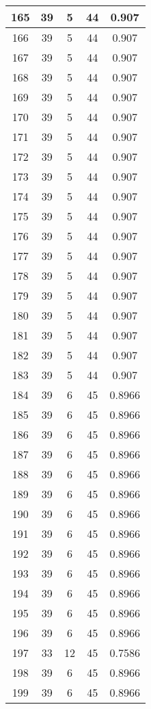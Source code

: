 \documentclass[letterpaper, 12pt]{article}
\begin{document}
\begin{longtable}{|c|c|c|c|c|}
\hline
165 & 39 & 5 & 44 & 0.907 \\
\hline
166 & 39 & 5 & 44 & 0.907 \\
\hline
167 & 39 & 5 & 44 & 0.907 \\
\hline
168 & 39 & 5 & 44 & 0.907 \\
\hline
169 & 39 & 5 & 44 & 0.907 \\
\hline
170 & 39 & 5 & 44 & 0.907 \\
\hline
171 & 39 & 5 & 44 & 0.907 \\
\hline
172 & 39 & 5 & 44 & 0.907 \\
\hline
173 & 39 & 5 & 44 & 0.907 \\
\hline
174 & 39 & 5 & 44 & 0.907 \\
\hline
175 & 39 & 5 & 44 & 0.907 \\
\hline
176 & 39 & 5 & 44 & 0.907 \\
\hline
177 & 39 & 5 & 44 & 0.907 \\
\hline
178 & 39 & 5 & 44 & 0.907 \\
\hline
179 & 39 & 5 & 44 & 0.907 \\
\hline
180 & 39 & 5 & 44 & 0.907 \\
\hline
181 & 39 & 5 & 44 & 0.907 \\
\hline
182 & 39 & 5 & 44 & 0.907 \\
\hline
183 & 39 & 5 & 44 & 0.907 \\
\hline
184 & 39 & 6 & 45 & 0.8966 \\
\hline
185 & 39 & 6 & 45 & 0.8966 \\
\hline
186 & 39 & 6 & 45 & 0.8966 \\
\hline
187 & 39 & 6 & 45 & 0.8966 \\
\hline
188 & 39 & 6 & 45 & 0.8966 \\
\hline
189 & 39 & 6 & 45 & 0.8966 \\
\hline
190 & 39 & 6 & 45 & 0.8966 \\
\hline
191 & 39 & 6 & 45 & 0.8966 \\
\hline
192 & 39 & 6 & 45 & 0.8966 \\
\hline
193 & 39 & 6 & 45 & 0.8966 \\
\hline
194 & 39 & 6 & 45 & 0.8966 \\
\hline
195 & 39 & 6 & 45 & 0.8966 \\
\hline
196 & 39 & 6 & 45 & 0.8966 \\
\hline
197 & 33 & 12 & 45 & 0.7586 \\
\hline
198 & 39 & 6 & 45 & 0.8966 \\
\hline
199 & 39 & 6 & 45 & 0.8966 \\
\hline
\end{longtable}
\end{document}
